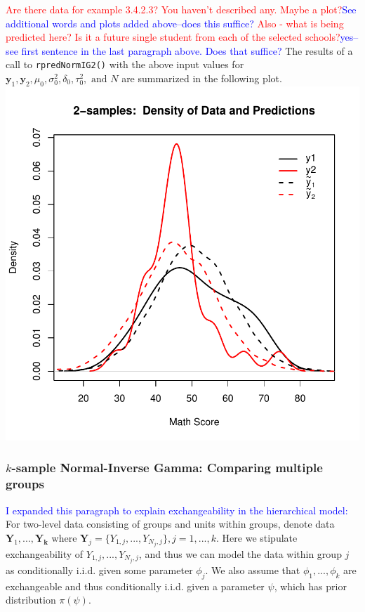 \documentclass[12pt, a4paper]{article}
\begin{document}
\textcolor{red}{Are there data for example 3.4.2.3? You haven't described any. Maybe a plot?\textcolor{blue}{See additional words and plots added above--does this suffice?}
Also - what is being predicted here? Is it a future single student from each of
the selected schools?\textcolor{blue}{yes--see first sentence in the last paragraph above.  Does that suffice?}}
      The results of a call to \texttt{rpredNormIG2()} with the above input values for $\mathbf{y}_1,\mathbf{y}_2,\mu_0,\sigma^2_0,\delta_0,\tau^2_0,\text{ and } N$ are summarized in the following plot.\\

\includegraphics{Thesis_v4-008}


    \subsubsection{$k$-sample Normal-Inverse Gamma:  Comparing multiple groups}
    \textcolor{blue}{I expanded this paragraph to explain exchangeability in the hierarchical model:}\\
    For two-level data consisting of groups and units within groups, denote data $\mathbf{Y}_1,...,\mathbf{Y_k}$ where $\mathbf{Y}_j = \{Y_{1,j},...,Y_{N_j,j}\}, j=1,...,k$. Here we stipulate exchangeability of $Y_{1,j},...,Y_{N_j,j}$, and thus we can model the data within group $j$ as conditionally i.i.d. given some parameter $\phi_j$.  We also assume that $\phi_1,...,\phi_k$ are exchangeable and thus conditionally i.i.d. given a parameter $\psi$, which has prior distribution $\pi(\psi)$.\\
\end{document}
